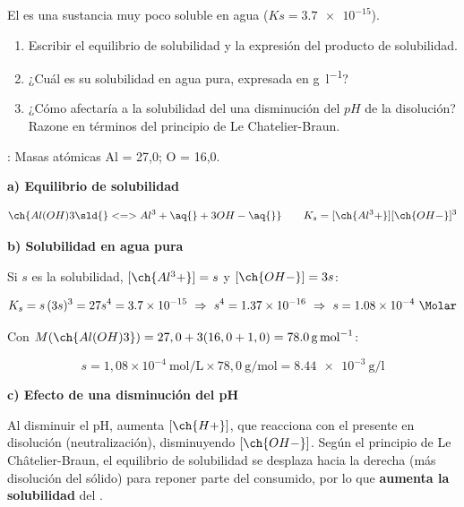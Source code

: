 \begin{exerciseEVAU}
    El  es una sustancia muy poco soluble en agua (\(Ks=\num{3,7e-15}\)).
    \begin{enumerate}[label=\letraminuscula]
\item Escribir el equilibrio de solubilidad y la expresión del producto de solubilidad.
\item ¿Cuál es su solubilidad en agua pura, expresada en \si{\g\per\litre}?
\item ¿Cómo afectaría a la solubilidad del  una disminución del \(pH\) de la disolución? Razone en términos del principio de Le Chatelier-Braun.
    \end{enumerate}

    \datos{}: Masas atómicas Al = 27,0; O = 16,0.


    \begin{solu}

        \textbf{a) Equilibrio de solubilidad}

        \begin{equation*}
            \ch{Al(OH)3 \sld{} <=> Al^3+ \aq{} + 3 OH- \aq{}} \qquad K_s = [\ch{Al^3+}][\ch{OH-}]^3
        \end{equation*}

        \textbf{b) Solubilidad en agua pura}

        Si \(s\) es la solubilidad, \([\ch{Al^3+}] = s\) y \([\ch{OH-}] = 3s\):

        \begin{equation*}
            K_s = s\, (3s)^3 = 27 s^4 = \num{3.7e-15} \ \Rightarrow \ s^4 = \num{1.37e-16} \ \Rightarrow \ s = \num{1.08e-4} \ \si{\Molar}
        \end{equation*}

        Con \(M(\ch{Al(OH)3}) = 27,0 + 3(16,0+1,0) = \SI{78.0}{\gram\per\mole}\):

        \begin{equation*}
            s = 1,08 \times 10^{-4} \ \text{mol/L} \times 78,0 \ \si{\gram\per\mole} = \num{8.44e-3} \ \si{\gram\per\litre}
        \end{equation*}

        \textbf{c) Efecto de una disminución del pH}

        Al disminuir el pH, aumenta \([\ch{H+}]\), que reacciona con el  presente en disolución (neutralización), disminuyendo \([\ch{OH-}]\). Según el principio de Le Châtelier-Braun, el equilibrio de solubilidad se desplaza hacia la derecha (más disolución del sólido) para reponer parte del  consumido, por lo que \textbf{aumenta la solubilidad} del .

    \end{solu}

\end{exerciseEVAU}

